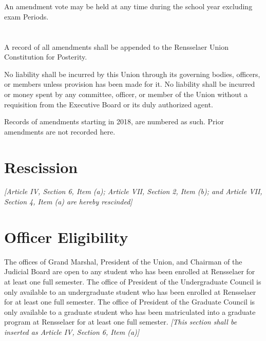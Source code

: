 \documentclass{uniondoc}
\begin{document}
\section{}

An amendment vote may be held at any time during the school year excluding exam Periods.

\section{}

A record of all amendments shall be appended to the Rensselaer Union Constitution for Posterity.


No liability shall be incurred by this Union through its governing bodies, officers, or members unless provision has been made for it. No liability shall be incurred or money spent by any committee, officer, or member of the Union without a requisition from the Executive Board or its duly authorized agent.

\amendments

\begin{center}
Records of amendments starting in 2018, are numbered as such. Prior amendments are not recorded here.
\end{center}


\section{Rescission}
\textit{[Article IV, Section 6, Item (a); Article VII, Section 2, Item (b); and Article VII, Section 4, Item (a) are hereby rescinded]}

\section{Officer Eligibility}
The offices of Grand Marshal, President of the Union, and Chairman of the Judicial Board are open to any student who has been enrolled at Rensselaer for at least one full semester. The office of President of the Undergraduate Council is only available to an undergraduate student who has been enrolled at Rensselaer for at least one full semester. The office of President of the Graduate Council is only available to a graduate student who has been matriculated into a graduate program at Rensselaer for at least one full semester.
\textit{[This section shall be inserted as Article IV, Section 6, Item (a)]}
\end{document}
